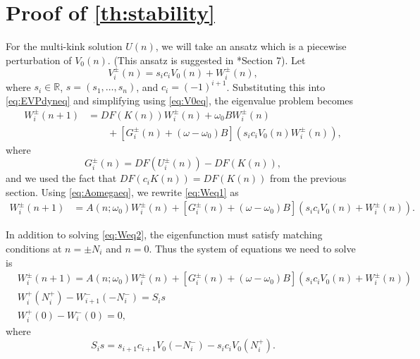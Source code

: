 \documentclass[12pt,reqno]{amsart}
\def\R{{\mathbb R}}
\begin{document}
\section{Proof of \texorpdfstring{\cref{th:stability}}{Theorem 2}}\label{sec:proof2}

For the multi-kink solution $U(n)$, we will take an ansatz which is a piecewise perturbation of $V_0(n)$. (This ansatz is suggested in \cite{Sandstede1998}*{Section 7}). Let
\begin{equation}\label{eq:Viansatz}
V_i^\pm(n) = s_i c_i V_0(n) + W_i^\pm(n),
\end{equation}
where $s_i \in \R$, $s = (s_1, \dots, s_n)$, and $c_i = (-1)^{i+1}$. Substituting this into \cref{eq:EVPdyneq} and simplifying using \cref{eq:V0eq}, the eigenvalue problem becomes
\begin{equation}\label{eq:Weq1}
\begin{aligned}
W_i^\pm(n+1)
&= DF(K(n)) W_i^\pm(n) + \omega_0 B W_i^\pm(n) \\
&\qquad + [G_i^\pm(n) + (\omega - \omega_0) B](s_i c_i V_0(n) W_i^\pm(n)),
\end{aligned}
\end{equation}
where
\begin{equation}\label{eq:Gipm}
G_i^\pm(n) = DF(U_i^\pm(n)) - DF(K(n)),
\end{equation}
and we used the fact that $DF(c_i K(n)) = DF(K(n))$ from the previous section. Using \cref{eq:Aomegaeq}, we rewrite \cref{eq:Weq1} as
\begin{align}\label{eq:Weq2}
W_i^\pm(n+1)
&= A(n; \omega_0) W_i^\pm(n) + [G_i^\pm(n) + (\omega - \omega_0) B](s_i c_i V_0(n) + W_i^\pm(n)).
\end{align}

In addition to solving \cref{eq:Weq2}, the eigenfunction must satisfy matching conditions at $n = \pm N_i$ and $n = 0$. Thus the system of equations we need to solve is
\begin{equation}\label{eq:eigWsystem1}
\begin{aligned}
& W_i^\pm(n+1)
= A(n; \omega_0) W_i^\pm(n) + [G_i^\pm(n) + (\omega - \omega_0) B](s_i c_i V_0(n) + W_i^\pm(n))\\
& W_i^+(N_i^+) - W_{i+1}^-(-N_i^-) = S_i s \\
& W_i^+(0) - W_i^-(0) = 0,
\end{aligned}
\end{equation}
where
\begin{equation}\label{defDid}
S_i s = s_{i+1} c_{i+1} V_0(-N_i^-) - s_i c_i V_0(N_i^+).
\end{equation}
\end{document}
